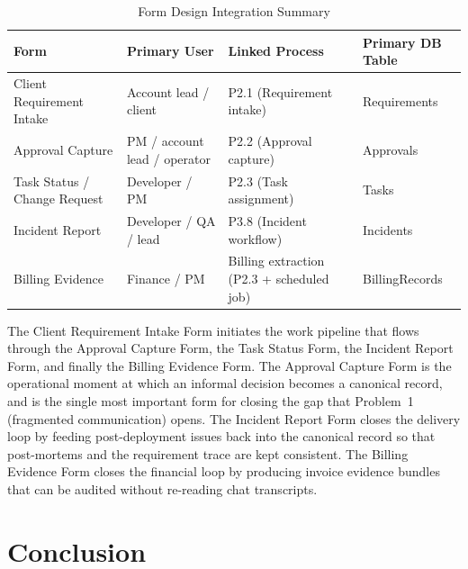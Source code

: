 \documentclass[12pt,a4paper]{report}
\begin{document}
\begin{table}[H]
\centering
\caption{Form Design Integration Summary}
\label{tab:form-integration}
\small
\renewcommand{\arraystretch}{1.25}
\begin{tabularx}{\textwidth}{>{\raggedright\arraybackslash}p{4.2cm}
                                >{\raggedright\arraybackslash}p{3.4cm}
                                >{\raggedright\arraybackslash}p{3.4cm}
                                >{\raggedright\arraybackslash}p{3.0cm}}
\toprule
\textbf{Form} & \textbf{Primary User} & \textbf{Linked Process} & \textbf{Primary DB Table} \\
\midrule
Client Requirement Intake   & Account lead / client & P2.1 (Requirement intake)            & Requirements \\
Approval Capture           & PM / account lead / operator & P2.2 (Approval capture)     & Approvals \\
Task Status / Change Request & Developer / PM        & P2.3 (Task assignment)               & Tasks \\
Incident Report            & Developer / QA / lead  & P3.8 (Incident workflow)            & Incidents \\
Billing Evidence           & Finance / PM           & Billing extraction (P2.3 + scheduled job) & BillingRecords \\
\bottomrule
\end{tabularx}
\end{table}

\noindent The Client Requirement Intake Form initiates the work pipeline that
flows through the Approval Capture Form, the Task Status Form, the Incident
Report Form, and finally the Billing Evidence Form. The Approval Capture
Form is the operational moment at which an informal decision becomes a
canonical record, and is the single most important form for closing the
gap that Problem~1 (fragmented communication) opens. The Incident Report
Form closes the delivery loop by feeding post-deployment issues back into
the canonical record so that post-mortems and the requirement trace are
kept consistent. The Billing Evidence Form closes the financial loop by
producing invoice evidence bundles that can be audited without re-reading
chat transcripts.

\section{Conclusion}
\label{sec:design-conclusion}
\end{document}
